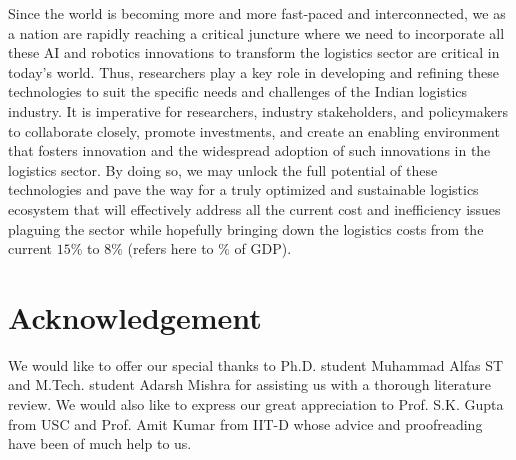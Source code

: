 \documentclass[paper=a4wide, fontsize=12pt]{scrartcl}
\begin{document}
Since the world is becoming more and more fast-paced and interconnected, we as a nation are rapidly reaching a critical juncture where we need to incorporate all these AI and robotics innovations to transform the logistics sector are critical in today's world. Thus, researchers play a key role in developing and refining these technologies to suit the specific needs and challenges of the Indian logistics industry. It is imperative for researchers, industry stakeholders, and policymakers to collaborate closely, promote investments, and create an enabling environment that fosters innovation and the widespread adoption of such innovations in the logistics sector. By doing so, we may unlock the full potential of these technologies and pave the way for a truly optimized and sustainable logistics ecosystem that will effectively address all the current cost and inefficiency issues plaguing the sector while hopefully bringing down the logistics costs from the current $15\%$ to $8\%$ (refers here to $\%$ of GDP).

\section{Acknowledgement}

We would like to offer our special thanks to Ph.D. student Muhammad Alfas ST and M.Tech. student Adarsh Mishra for assisting us with a thorough literature review. We would also like to express our great appreciation to Prof. S.K. Gupta from USC and Prof. Amit Kumar from IIT-D whose advice and proofreading have been of much help to us.

\printbibliography
\end{document}
